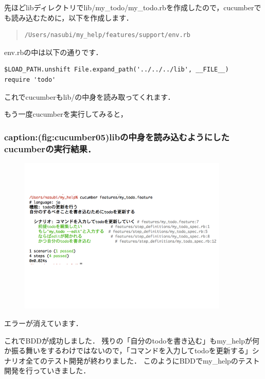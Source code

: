先ほどlibディレクトリでlib/my\_todo/my\_todo.rbを作成したので，cucumberでも読み込むために，以下を作成します．
\begin{quote}\begin{verbatim}
/Users/nasubi/my_help/features/support/env.rb
\end{verbatim}\end{quote}
env.rbの中は以下の通りです．
\begin{lstlisting}[style=customRuby]
$LOAD_PATH.unshift File.expand_path('../../../lib', __FILE__)
require 'todo'
\end{lstlisting}
これでcucumberもlib/の中身を読み取ってくれます．

もう一度cucumberを実行してみると，

\subsubsection{caption:(fig:cucumber05)libの中身を読み込むようにしたcucumberの実行結果．}
\begin{figure}[htbp]\begin{center}
\includegraphics[width=10cm,bb= 0 0 737 553]{../figs/./cucumber05.001.jpg}
\caption{}
\label{default}\end{center}\end{figure}
エラーが消えています．

これでBDDが成功しました．
残りの「自分のtodoを書き込む」もmy\_helpが何か振る舞いをするわけではないので，「コマンドを入力してtodoを更新する」シナリオ全てのテスト開発が終わりました．
このようにBDDでmy\_helpのテスト開発を行っていきました．

